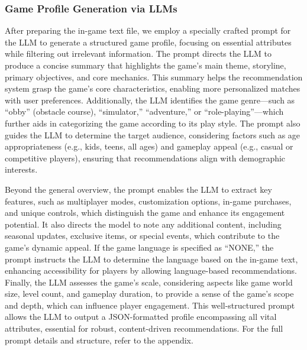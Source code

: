 \subsubsection{Game Profile Generation via LLMs}
After preparing the in-game text file, we employ a specially crafted prompt for the LLM to generate a structured game profile, focusing on essential attributes while filtering out irrelevant information. The prompt directs the LLM to produce a concise summary that highlights the game’s main theme, storyline, primary objectives, and core mechanics. This summary helps the recommendation system grasp the game’s core characteristics, enabling more personalized matches with user preferences. Additionally, the LLM identifies the game genre—such as “obby” (obstacle course), “simulator,” “adventure,” or “role-playing”—which further aids in categorizing the game according to its play style. The prompt also guides the LLM to determine the target audience, considering factors such as age appropriateness (e.g., kids, teens, all ages) and gameplay appeal (e.g., casual or competitive players), ensuring that recommendations align with demographic interests.

Beyond the general overview, the prompt enables the LLM to extract key features, such as multiplayer modes, customization options, in-game purchases, and unique controls, which distinguish the game and enhance its engagement potential. It also directs the model to note any additional content, including seasonal updates, exclusive items, or special events, which contribute to the game’s dynamic appeal. If the game language is specified as “NONE,” the prompt instructs the LLM to determine the language based on the in-game text, enhancing accessibility for players by allowing language-based recommendations. Finally, the LLM assesses the game’s scale, considering aspects like game world size, level count, and gameplay duration, to provide a sense of the game’s scope and depth, which can influence player engagement. This well-structured prompt allows the LLM to output a JSON-formatted profile encompassing all vital attributes, essential for robust, content-driven recommendations. For the full prompt details and structure, refer to the appendix.

